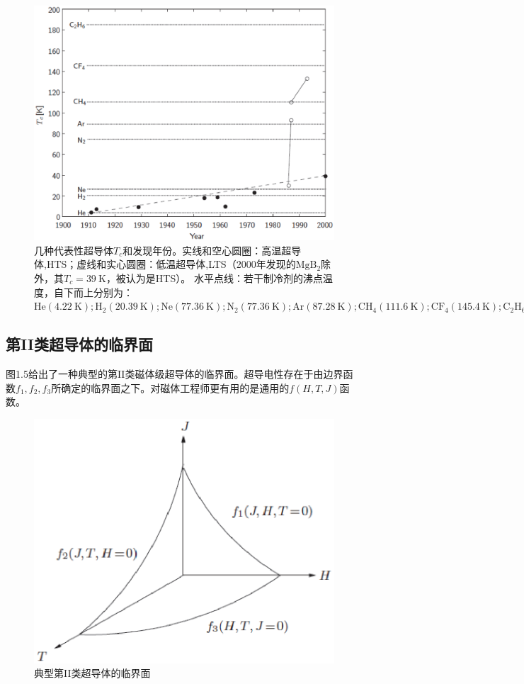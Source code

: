 \begin{figure}%
  \centering
 \includegraphics[scale=0.6]{chpt1/figs/fig1.4.eps}
  \caption{
几种代表性超导体$T_c$和发现年份。实线和空心圆圈：高温超导体,HTS；虚线和实心圆圈：低温超导体,LTS（2000年发现的$\mathrm{MgB_2}$除外，其$	T_c=39\ \mathrm{K}$，被认为是HTS）。
水平点线：若干制冷剂的沸点温度，自下而上分别为：$\mathrm{
He(4.22\ K);H_2(20.39\ K);Ne(77.36\ K);N_2(77.36\ K);Ar(87.28\ K);
CH_4(111.6\ K);CF_4(145.4\ K);C_2H_6(184.6\ K)}。$
}
\end{figure}


\subsection{第II类超导体的临界面}
图1.5给出了一种典型的第II类磁体级超导体的临界面。超导电性存在于由边界函数$f_1,f_2,f_3$所确定的临界面之下。对磁体工程师更有用的是通用的$f(H,T,J)$函数。
\begin{figure}
  \centering
 \includegraphics[scale=0.6]{chpt1/figs/fig1.5.eps}
  \caption{
典型第II类超导体的临界面
}\label{ciriticalsurface}
\end{figure}


